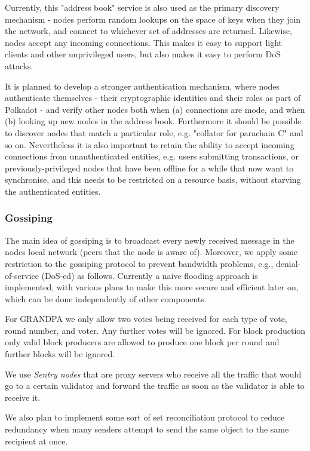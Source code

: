 Currently, this "address book" service is also used as the primary discovery mechanism - nodes perform random lookups on the space of keys when they join the network, and connect to whichever set of addresses are returned. Likewise, nodes accept any incoming connections. This makes it easy to support light clients and other unprivileged users, but also makes it easy to perform DoS attacks.

It is planned to develop a stronger authentication mechanism, where nodes authenticate themselves - their cryptographic identities and their roles as part of Polkadot - and verify other nodes both when (a) connections are mode, and when (b) looking up new nodes in the address book. Furthermore it should be possible to discover nodes that match a particular role, e.g. "collator for parachain C" and so on. Nevertheless it is also important to retain the ability to accept incoming connections from unauthenticated entities, e.g. users submitting transactions, or previously-privileged nodes that have been offline for a while that now want to synchronise, and this needs to be restricted on a resource basis, without starving the authenticated entities.

\subsubsection{Gossiping} \label{sec:gossiping}
The main idea of gossiping is to broadcast every newly received message in the nodes local network (peers that the node is aware of). Moreover, we apply some restriction to the gossiping protocol to prevent bandwidth problems, e.g., denial-of-service (DoS-ed) as follows. Currently a naive flooding approach is implemented, with various plans to make this more secure and efficient later on, which can be done independently of other components.

For GRANDPA we only allow two votes being received for each type of vote, round number, and voter. Any further votes will be ignored. For block production only valid block producers are allowed to produce one block per round and further blocks will be ignored.

We use \emph{Sentry nodes} that are proxy servers who receive all the traffic that would go to a certain validator and forward the traffic as soon as the validator is able to receive it.

We also plan to implement some sort of set reconciliation protocol to reduce redundancy when many senders attempt to send the same object to the same recipient at once.

